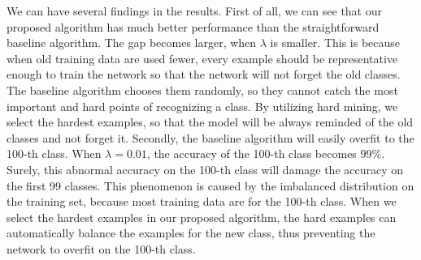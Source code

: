 We can have several findings in the results. First of all, we can see that our proposed algorithm has much better performance than the straightforward baseline algorithm. The gap becomes larger, when $\lambda$ is smaller. This is because when old training data are used fewer, every example should be representative enough to train the network so that the network will not forget the old classes. The baseline algorithm chooses them randomly, so they cannot catch the most important and hard points of recognizing a class. By utilizing hard mining, we select the hardest examples, so that the model will be always reminded of the old classes and not forget it. Secondly, the baseline algorithm will easily overfit to the 100-th class. When $\lambda=0.01$, the accuracy of the 100-th class becomes $99\%$. Surely, this abnormal accuracy on the 100-th class will damage the accuracy on the first 99 classes. This phenomenon is caused by the imbalanced distribution on the training set, because most training data are for the 100-th class. When we select the hardest examples in our proposed algorithm, the hard examples can automatically balance the examples for the new class, thus preventing the network to overfit on the 100-th class.








